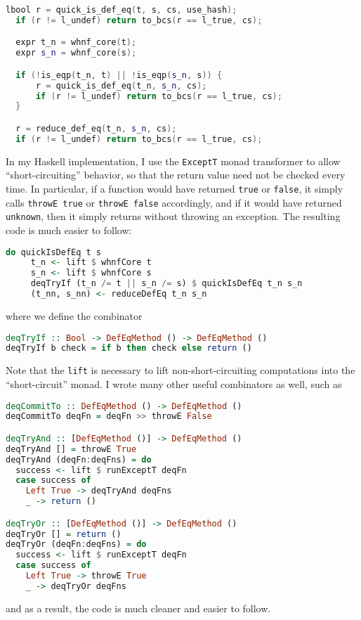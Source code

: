 \documentclass{article}
\begin{document}
\begin{spacing}{1.1}
\begin{lstlisting}[language=C++]
  lbool r = quick_is_def_eq(t, s, cs, use_hash);
  if (r != l_undef) return to_bcs(r == l_true, cs);

  expr t_n = whnf_core(t);
  expr s_n = whnf_core(s);

  if (!is_eqp(t_n, t) || !is_eqp(s_n, s)) {
      r = quick_is_def_eq(t_n, s_n, cs);
      if (r != l_undef) return to_bcs(r == l_true, cs);
  }

  r = reduce_def_eq(t_n, s_n, cs);
  if (r != l_undef) return to_bcs(r == l_true, cs);
\end{lstlisting}

In my Haskell implementation, I use the \lstinline{ExceptT} monad transformer to allow ``short-circuiting'' behavior, so that the return value need not be checked every time. In particular, if a function would have returned \lstinline{true} or \lstinline{false}, it simply calls \lstinline{throwE true} or \lstinline{throwE false} accordingly, and if it would have returned \lstinline{unknown}, then it simply returns without throwing an exception. The resulting code is much easier to follow:

\begin{lstlisting}[language=Haskell]
  do quickIsDefEq t s
     t_n <- lift $ whnfCore t
     s_n <- lift $ whnfCore s
     deqTryIf (t_n /= t || s_n /= s) $ quickIsDefEq t_n s_n
     (t_nn, s_nn) <- reduceDefEq t_n s_n
\end{lstlisting}

where we define the combinator
\begin{lstlisting}[language=Haskell]
deqTryIf :: Bool -> DefEqMethod () -> DefEqMethod ()
deqTryIf b check = if b then check else return ()
\end{lstlisting}

Note that the \lstinline{lift} is necessary to lift non-short-circuiting computations into the ``short-circuit'' monad. I wrote many other useful combinators as well, such as
\begin{lstlisting}[language=Haskell]
deqCommitTo :: DefEqMethod () -> DefEqMethod ()
deqCommitTo deqFn = deqFn >> throwE False

deqTryAnd :: [DefEqMethod ()] -> DefEqMethod ()
deqTryAnd [] = throwE True
deqTryAnd (deqFn:deqFns) = do
  success <- lift $ runExceptT deqFn
  case success of
    Left True -> deqTryAnd deqFns
    _ -> return ()

deqTryOr :: [DefEqMethod ()] -> DefEqMethod ()
deqTryOr [] = return ()
deqTryOr (deqFn:deqFns) = do
  success <- lift $ runExceptT deqFn
  case success of
    Left True -> throwE True
    _ -> deqTryOr deqFns
\end{lstlisting}
and as a result, the code is much cleaner and easier to follow.


\end{spacing}
\end{document}
